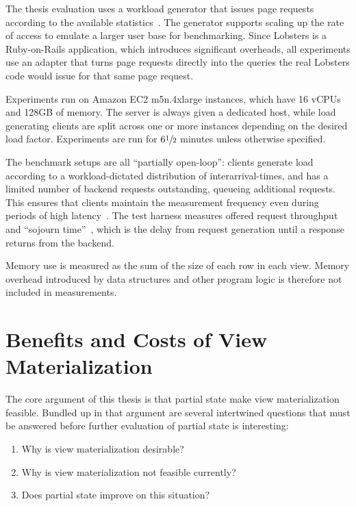 The thesis evaluation uses a workload generator that issues page requests
according to the available statistics~\cite{generator}. The generator supports
scaling up the rate of access to emulate a larger user base for benchmarking.
Since Lobsters is a Ruby-on-Rails application, which introduces significant
overheads, all experiments use an adapter that turns page requests directly into
the queries the real Lobsters code would issue for that same page request.

Experiments run on Amazon EC2 m5n.4xlarge instances, which have 16 vCPUs and
128GB of memory. The server is always given a dedicated host, while load
generating clients are split across one or more instances depending on the
desired load factor. Experiments are run for $6\sfrac{1}{2}$ minutes unless
otherwise specified.

The benchmark setups are all ``partially open-loop'': clients generate load
according to a workload-dictated distribution of interarrival-times, and has a
limited number of backend requests outstanding, queueing additional requests.
This ensures that clients maintain the measurement frequency even during periods
of high latency~\cite{frank-open-loop}. The test harness measures offered
request throughput and ``sojourn time''~\cite{open-loop-cautionary-tale}, which
is the delay from request generation until a response returns from the backend.

Memory use is measured as the sum of the size of each row in each view. Memory
overhead introduced by data structures and other program logic is therefore not
included in measurements.


\section{Benefits and Costs of View Materialization}
\label{s:eval:why}

The core argument of this thesis is that partial state make view materialization
feasible. Bundled up in that argument are several intertwined questions that
must be answered before further evaluation of partial state is interesting:

\begin{enumerate}
    \item Why is view materialization desirable?
    \item Why is view materialization not feasible currently?
    \item Does partial state improve on this situation?
\end{enumerate}

